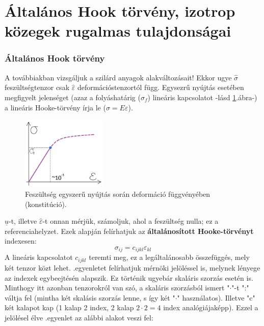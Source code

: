 \documentclass[a4paper, 12pt, titlepage]{article}
\begin{document}
\pagestyle{plain}
\part*{Általános Hook törvény, izotrop közegek rugalmas tulajdonságai} %
\section*{Általános Hook törvény}
A továbbiakban vizsgáljuk a szilárd anyagok alakváltozásait! Ekkor ugye $\hat{\sigma}$ feszültségtenzor csak $\hat{\varepsilon}$ deformációstenzortól függ. Egysezrű nyújtás esetében megfigyelt jelenséget (azaz a folyáshatárig ($\sigma_{f}$) lineáris kapcsolatot -lásd \ref{fig:hook}.\hspace{1mm}ábra-) a lineáris Hooke-törvény írja le ($\sigma=E\varepsilon$).
	\begin{figure}[!h]
	\includegraphics[height=3.5cm]{./hook.png}
	\centering
	\caption{Feszültség egyszerű nyújtás során deformáció függvényében (konstitúció).}
	\label{fig:hook}
	\end{figure}
$\underline{u}$-t, illetve $\hat{\varepsilon}$-t onnan mérjük, számoljuk, ahol a feszültség nulla; ez a referenciahelyzet.
\newline
Ezek alapján felírhatjuk az \textbf{általánosított Hooke-törvényt} indexesen: %
	\begin{equation}
\sigma_{ij}=c_{ijkl}\varepsilon_{kl}
	\label{eq:hook}
	\end{equation}
A lineáris kapcsolatot $c_{ijkl}$ teremti meg, ez a legáltalánosabb összefüggés, mely két tenzor közt lehet.
\newline
{}.\hspace{1mm}egyenletet felírhatjuk mérnöki jelöléssel is, melynek lényege az indexek egybeejtésén alapszik. Ez történik ugyebár skaláris szorzás esetén is. Minthogy itt azonban tenzorokról van szó, a skaláris szorzásból ismert "$\cdot$"-t ":" váltja fel (mintha két skalásis szorzás lenne, s így két "$\cdot$" használatos). Illetve "c" két kalapot kap (1 kalap 2 index, 2 kalap $2\cdot 2=4$ index analógiájaképp). Ezzel a jelölésel élve .\hspace{1mm}egyenlet az alábbi alakot veszi fel:
\end{document}
